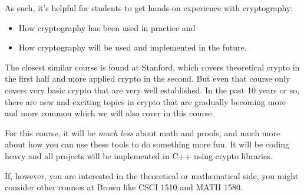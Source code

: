 As such, it's helpful for students to get hands-on experience with cryptography:
\begin{itemize}
    \item How cryptography has been used in practice and
    \item How cryptography will be used and implemented in the future.
\end{itemize}

The closest similar course is found at Stanford, which covers theoretical crypto in the first half and more applied crypto in the second. But even that course only covers very basic crypto that are very well established. In the past 10 years or so, there are new and exciting topics in crypto that are gradually becoming more and more common which we will also cover in this course.

For this course, it will be \emph{much less} about math and proofs, and much more about how you can use these tools to do something more fun. It will be coding heavy and all projects will be implemented in C++ using crypto libraries. 

If, however, you are interested in the theoretical or mathematical side, you might consider other courses at Brown like CSCI 1510 and MATH 1580.




